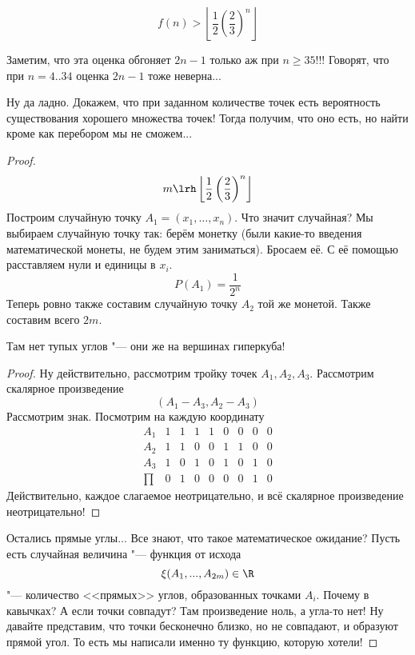 \begin{theorem}
	\[f(n) > \left\lfloor \frac12 \left(\frac23\right)^n\right\rfloor\]
\end{theorem}

Заметим, что эта оценка обгоняет $2n-1$ только аж при $n \ge 35$!!! Говорят, что при $n=4..34$ оценка $2n-1$ тоже неверна...

Ну да ладно. Докажем, что при заданном количестве точек есть вероятность существования хорошего множества точек! Тогда получим, что оно есть, но найти кроме как перебором мы не сможем...

\begin{proof}
	\[ m \lrh \left\lfloor \frac12 \left(\frac23\right)^n\right\rfloor \]
	Построим случайную точку $A_1 = (x_1, \dots, x_n)$.
	Что значит случайная?
	Мы выбираем случайную точку так: берём монетку (были какие-то введения математической монеты, не будем этим заниматься).
	Бросаем её.
	С её помощью расставляем нули и единицы в $x_i$.
	\[ P(A_1) = \frac1{2^n} \]
	Теперь ровно также составим случайную точку $A_2$ той же монетой.
	Также составим всего $2m$.

	\begin{assertion}
		Там нет тупых углов "--- они же на вершинах гиперкуба!
	\end{assertion}
	\begin{proof}
		Ну действительно, рассмотрим тройку точек $A_1, A_2, A_3$.
		Рассмотрим скалярное произведение
		\[ (A_1 - A_3, A_2 - A_3) \]
		Рассмотрим знак. Посмотрим на каждую координату
		\[
			\begin{matrix}
				A_1   & 1 & 1 & 1 & 1 & 0 & 0 & 0 & 0 \\
				A_2   & 1 & 1 & 0 & 0 & 1 & 1 & 0 & 0 \\
				A_3   & 1 & 0 & 1 & 0 & 1 & 0 & 1 & 0 \\
				\prod & 0 & 1 & 0 & 0 & 0 & 0 & 1 & 0
			\end{matrix}
		\]
		Действительно, каждое слагаемое неотрицательно, и всё скалярное произведение неотрицательно!
	\end{proof}

	Остались прямые углы... Все знают, что такое математическое ожидание? Пусть есть случайная величина "--- функция от исхода
	\[ \xi(A_1, ..., A_{2m}) \in \R \]
	"--- количество <<прямых>> углов, образованных точками $A_i$.
	Почему в кавычках?
	А если точки совпадут?
	Там произведение ноль, а угла-то нет!
	Ну давайте представим, что точки бесконечно близко, но не совпадают, и образуют прямой угол.
	То есть мы написали именно ту функцию, которую хотели!


\end{proof}
